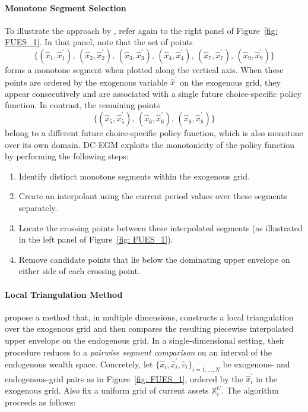 \documentclass[12pt]{article}
\begin{document}
\paragraph{Monotone Segment Selection \citep{Iskhakov2017}}

To illustrate the approach by \cite{Iskhakov2017}, refer again to the right panel of Figure~\ref{fig: FUES_1}. In that panel, note that the set of points
%
\[
\bigl\{(\hat{x}_{1}, \hat{x}_{1}^{\prime}),\, (\hat{x}_{2}, \hat{x}_{2}^{\prime}),\, (\hat{x}_{3}, \hat{x}_{3}^{\prime}),\, (\hat{x}_{4}, \hat{x}_{4}^{\prime}),\, (\hat{x}_{7}, \hat{x}_{7}^{\prime}),\, (\hat{x}_{9}, \hat{x}_{9}^{\prime})\bigr\}
\]
forms a monotone segment when plotted along the vertical axis. When these points are ordered by the exogenous variable $\hat{x}^{\prime}$ on the exogenous grid, they appear consecutively and are associated with a single future choice-specific policy function. In contrast, the remaining points 
\[
\bigl\{(\hat{x}_{5}, \hat{x}_{5}^{\prime}),\, (\hat{x}_{6}, \hat{x}_{6}^{\prime}),\, (\hat{x}_{8}, \hat{x}_{8}^{\prime})\bigr\}
\]
belong to a different future choice-specific policy function, which is also monotone over its own domain. DC-EGM exploits the monotonicity of the policy function by performing the following steps:
%
\begin{enumerate}[label=(\roman*)]
    \item Identify distinct monotone segments within the exogenous grid.
    \item Create an interpolant using the current period values over these segments separately.
    \item Locate the crossing points between these interpolated segments (as illustrated in the left panel of Figure~\ref{fig: FUES_1}).
    \item Remove candidate points that lie below the dominating upper envelope on either side of each crossing point.
\end{enumerate}


\paragraph{Local Triangulation Method \citep{Druedahl2017}}

\cite{Druedahl2017} propose a method that, in multiple dimensions, constructs a local triangulation over the exogenous grid and then compares the resulting piecewise interpolated upper envelope on the endogenous grid. In a single-dimensional setting, their procedure reduces to a \emph{pairwise segment comparison} on an interval of the endogenous wealth space. Concretely, let 
\(\{\hat{x}_{i}, \hat{x}_{i}^{\prime}, \hat{v}_{i}\}_{i=1,\dots,N}\)
be exogenous- and endogenous-grid pairs as in Figure~\ref{fig: FUES_1}, ordered by the $\hat{x}_{i}^{\prime}$ in the exogenous grid. Also fix a uniform grid of current assets $\mathbb{X}_{i}^{U}$. The algorithm proceeds as follows:
\end{document}
